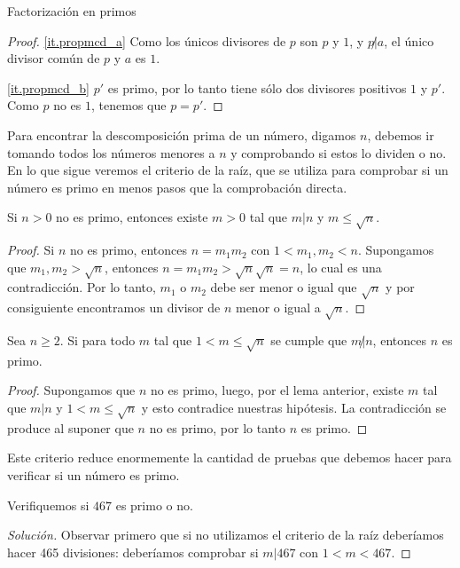 \begin{section}{Factorización en primos}
\begin{proof}
\noindent \ref{it.propmcd_a} Como los únicos divisores de $p$ son $p$ y $1$, y $p{\not|}a$, el único  divisor común de $p$ y $a$ es $1$.

\noindent \ref{it.propmcd_b} $p'$ es primo, por lo tanto tiene sólo dos divisores positivos $1$ y $p'$. Como $p$ no es $1$, tenemos que  $p=p'$.
\end{proof}

Para encontrar la descomposición prima de un número, digamos $n$, debemos ir tomando todos los números menores a $n$ y comprobando si estos lo dividen o no. En lo que sigue veremos el criterio de la raíz, que se utiliza para comprobar si un número es primo en menos pasos que la comprobación directa.  

\begin{lema} Si $n>0$ no es primo, entonces existe $m>0$ tal que $m|n$ y $m \le \sqrt{n}$.  
\end{lema}
\begin{proof}
Si $n$ no es primo, entonces $n = m_1m_2$ con $1 < m_1,m_2 < n$. Supongamos que $m_1,m_2 > \sqrt n$, entonces $n = m_1m_2 >  \sqrt n\sqrt n = n$, lo cual es una contradicción. Por lo tanto, $m_1$ o $m_2$ debe ser menor o igual que $\sqrt n$ y por consiguiente encontramos un divisor de $n$ menor o igual a  $\sqrt n$. 
\end{proof}

\begin{proposicion}\label{craiz}Sea $n\ge 2$. Si para todo $m$ tal que $1<m \le \sqrt{n}$ se cumple que $m{\not|}n$, entonces $n$ es primo.
\end{proposicion}
 \begin{proof}  Supongamos que $n$ no es primo, luego, por el lema anterior, existe $m$ tal que  $m|n$ y $1 < m \le \sqrt n$ y esto contradice nuestras hipótesis. La contradicción se produce al suponer que $n$ no es primo, por lo tanto $n$ es primo. 
\end{proof}

Este criterio reduce enormemente la cantidad de pruebas que debemos hacer para verificar si un número es primo.

\begin{ejemplo*} Verifiquemos si $467$ es primo o no.
\end{ejemplo*}
\begin{proof}[Solución]
     Observar primero que si no utilizamos el criterio de la raíz deberíamos hacer 465 divisiones: deberíamos comprobar si $m|467$ con  $1<m <467$. 
    

\end{proof}
\end{section}
